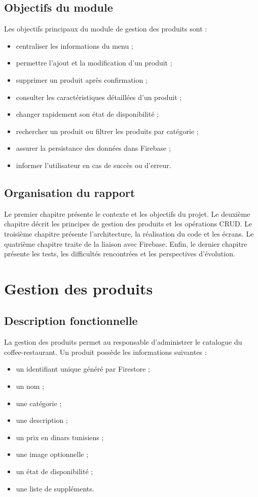 \documentclass[12pt,a4paper]{report}
\begin{document}
\section{Objectifs du module}

Les objectifs principaux du module de gestion des produits sont :
\begin{itemize}[label=\textbullet]
  \item centraliser les informations du menu ;
  \item permettre l'ajout et la modification d'un produit ;
  \item supprimer un produit après confirmation ;
  \item consulter les caractéristiques détaillées d'un produit ;
  \item changer rapidement son état de disponibilité ;
  \item rechercher un produit ou filtrer les produits par catégorie ;
  \item assurer la persistance des données dans Firebase ;
  \item informer l'utilisateur en cas de succès ou d'erreur.
\end{itemize}

\section{Organisation du rapport}

Le premier chapitre présente le contexte et les objectifs du projet. Le deuxième
chapitre décrit les principes de gestion des produits et les opérations CRUD.
Le troisième chapitre présente l'architecture, la réalisation du code et les écrans.
Le quatrième chapitre traite de la liaison avec Firebase. Enfin, le dernier chapitre
présente les tests, les difficultés rencontrées et les perspectives d'évolution.

\chapter{Gestion des produits}

\section{Description fonctionnelle}

La gestion des produits permet au responsable d'administrer le catalogue du
coffee-restaurant. Un produit possède les informations suivantes :
\begin{itemize}[label=\textbullet]
  \item un identifiant unique généré par Firestore ;
  \item un nom ;
  \item une catégorie ;
  \item une description ;
  \item un prix en dinars tunisiens ;
  \item une image optionnelle ;
  \item un état de disponibilité ;
  \item une liste de suppléments.
\end{itemize}
\end{document}

